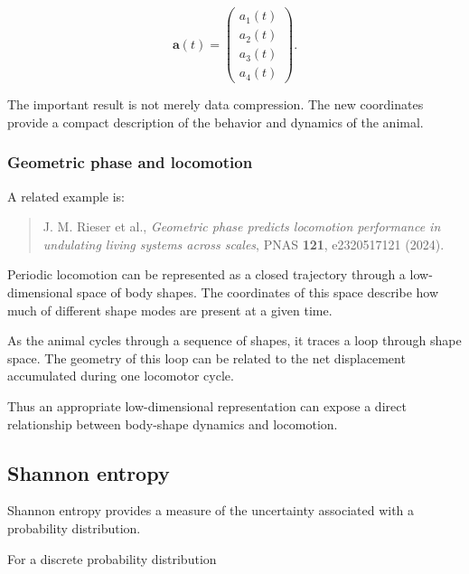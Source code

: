 \begin{equation}
    \mathbf{a}(t)=
    \begin{pmatrix}
        a_1(t) \\
        a_2(t) \\
        a_3(t) \\
        a_4(t)
    \end{pmatrix}.
\end{equation}

The important result is not merely data compression.
The new coordinates provide a compact description of the behavior and dynamics of the animal.


\subsubsection{Geometric phase and locomotion}

A related example is:

\begin{quote}
J. M. Rieser et al.,
\textit{Geometric phase predicts locomotion performance in undulating living systems across scales},
PNAS \textbf{121}, e2320517121 (2024).
\end{quote}

Periodic locomotion can be represented as a closed trajectory through a low-dimensional space of body shapes.
The coordinates of this space describe how much of different shape modes are present at a given time.

As the animal cycles through a sequence of shapes, it traces a loop through shape space.
The geometry of this loop can be related to the net displacement accumulated during one locomotor cycle.

Thus an appropriate low-dimensional representation can expose a direct relationship between body-shape dynamics and locomotion.


\subsection{Shannon entropy}

Shannon entropy provides a measure of the uncertainty associated with a probability distribution.

For a discrete probability distribution

